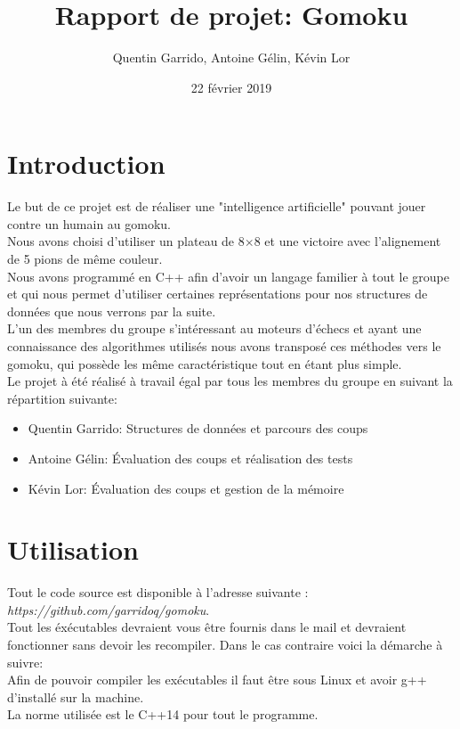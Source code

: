 \documentclass{article}
\title{Rapport de projet: Gomoku}
\author{Quentin Garrido, Antoine Gélin, Kévin Lor}
\date{22 février 2019}
\begin{document}
\maketitle
\tableofcontents
\pagebreak

\section{Introduction}

Le but de ce projet est de réaliser une "intelligence artificielle" pouvant jouer contre un humain au gomoku.\\
Nous avons choisi d'utiliser un plateau de 8$\times$8 et une victoire avec l'alignement de 5 pions de même couleur.\\
Nous avons programmé en C++ afin d'avoir un langage familier à tout le groupe et qui nous permet d'utiliser
certaines représentations pour nos structures de données que nous verrons par la suite.\\
L'un des membres du groupe s'intéressant au moteurs d'échecs et ayant une connaissance des algorithmes utilisés
nous avons transposé ces méthodes vers le gomoku, qui possède les même caractéristique tout en étant plus simple.\\

Le projet à été réalisé à travail égal par tous les membres du groupe en suivant la répartition suivante:
\begin{itemize}
	\item Quentin Garrido: Structures de données et parcours des coups
	\item Antoine Gélin: Évaluation des coups et réalisation des tests
	\item Kévin Lor: Évaluation des coups et gestion de la mémoire
\end{itemize}

\section{Utilisation}

Tout le code source est disponible à l'adresse suivante : \textit{https://github.com/garridoq/gomoku}.\\

Tout les éxécutables devraient vous être fournis dans le mail et devraient fonctionner sans devoir
les recompiler. Dans le cas contraire voici la démarche à suivre:\\

Afin de pouvoir compiler les exécutables il faut être sous Linux et avoir g++ d'installé sur la machine.\\
La norme utilisée est le C++14 pour tout le programme.\\
\end{document}
